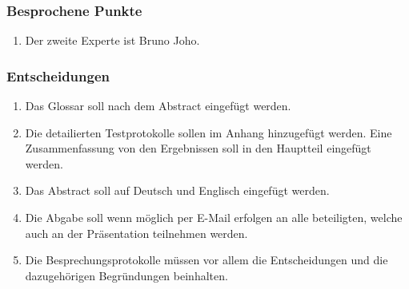 \documentclass[a4paper, table]{article}
\begin{document}
\subsubsection*{Besprochene Punkte}

\begin{enumerate}
    \item Der zweite Experte ist Bruno Joho.
\end{enumerate}

\subsubsection*{Entscheidungen}

\begin{enumerate}
    \item Das Glossar soll nach dem Abstract eingefügt werden.
    \item Die detailierten Testprotokolle sollen im Anhang hinzugefügt werden. Eine Zusammenfassung von den Ergebnissen soll in den Hauptteil eingefügt werden.
    \item Das Abstract soll auf Deutsch und Englisch eingefügt werden.
    \item Die Abgabe soll wenn möglich per E-Mail erfolgen an alle beteiligten, welche auch an der Präsentation teilnehmen werden.
    \item Die Besprechungsprotokolle müssen vor allem die Entscheidungen und die dazugehörigen Begründungen beinhalten.
\end{enumerate}
\end{document}
